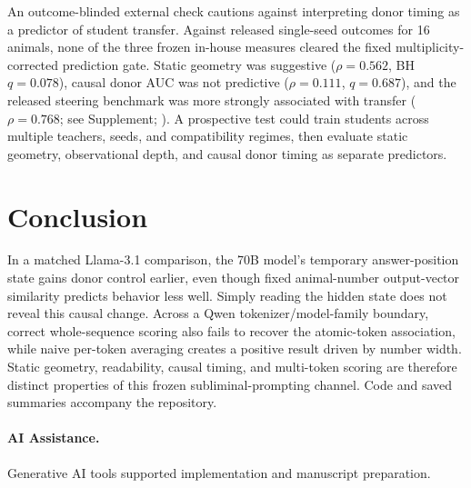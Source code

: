 \documentclass[letterpaper]{article}
\begin{document}
An outcome-blinded external check cautions against interpreting donor timing as
a predictor of student transfer. Against released single-seed outcomes for 16
animals, none of the three frozen in-house measures cleared the fixed
multiplicity-corrected prediction gate. Static geometry was suggestive
($\rho=0.562$, BH $q=0.078$), causal donor AUC was not predictive
($\rho=0.111$, $q=0.687$), and the released steering benchmark was more strongly
associated with transfer ($\rho=0.768$; see Supplement;
\citealp{blank2026steering}). A prospective test could train students across
multiple teachers, seeds, and compatibility regimes, then evaluate static
geometry, observational depth, and causal donor timing as separate predictors.

\section{Conclusion}

In a matched Llama-3.1 comparison, the 70B model's temporary answer-position
state gains donor control earlier, even though fixed animal-number
output-vector similarity predicts behavior less well. Simply reading the
hidden state does not reveal this causal change. Across a Qwen
tokenizer/model-family boundary, correct whole-sequence scoring also fails to
recover the atomic-token association, while naive per-token averaging creates
a positive result driven by number width. Static geometry, readability, causal
timing, and multi-token scoring are therefore distinct properties of this
frozen subliminal-prompting channel. Code and saved summaries accompany the
repository.

\paragraph{AI Assistance.}
Generative AI tools supported implementation and manuscript preparation.


\end{document}
